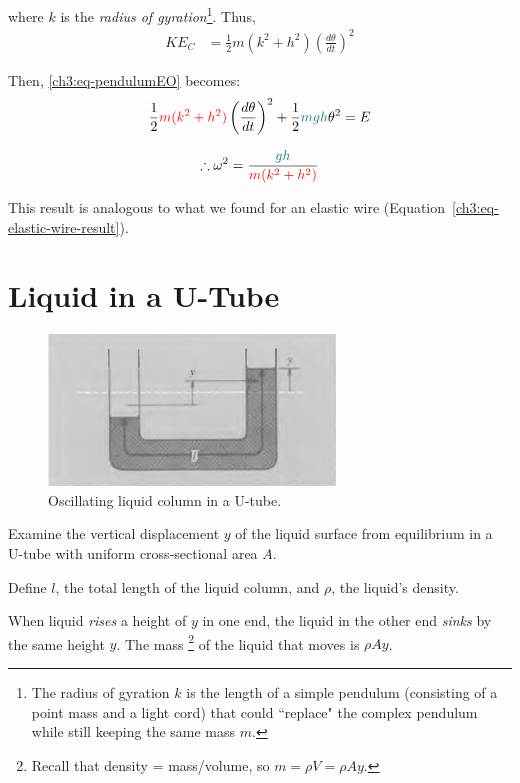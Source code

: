 where $k$ is the \emph{radius of gyration}\footnote{The radius of gyration $k$ is the length of a simple pendulum (consisting of a point mass and a light cord) that could ``replace" the complex pendulum while still keeping the same mass $m$.}. Thus,
\begin{align*}
	KE_C %
	&= \frac{1}{2} m(k^2 + h^2 ) \left( \frac{d\theta}{dt} \right)^2
\end{align*}

Then, \eqref{ch3:eq-pendulumEO} becomes:
\[ \frac{1}{2} \textcolor{red}{m(k^2+h^2)} \left( \frac{d\theta}{dt} \right)^2  + \frac{1}{2} \textcolor{teal}{mgh}\theta^2 = E \]

\begin{equation*}
	\therefore \omega^2 = \frac{\textcolor{teal}{gh}}{\textcolor{red}{m(k^2+h^2)}}
\end{equation*}

This result is analogous to what we found for an elastic wire (Equation~\ref{ch3:eq-elastic-wire-result}).

\section{Liquid in a U-Tube} \label{ch3:sec-uTube}

\begin{figure}
	\centering
	\includegraphics[scale=0.8]{phys232/Ch3-utube.png}
	\caption{Oscillating liquid column in a U-tube.}
	\label{ch3:fig-utube}
\end{figure}

Examine the vertical displacement $y$ of the liquid surface from equilibrium in a U-tube with uniform cross-sectional area $A$.

Define $l$, the total length of the liquid column, and $\rho$, the liquid's density.

When liquid \textit{rises} a height of $y$ in one end, the liquid in the other end \textit{sinks} by the same height $y$. The mass%
\footnote{Recall that density = mass/volume, so $m=\rho V=\rho Ay$.}
of the liquid that moves is $\rho Ay$. 

